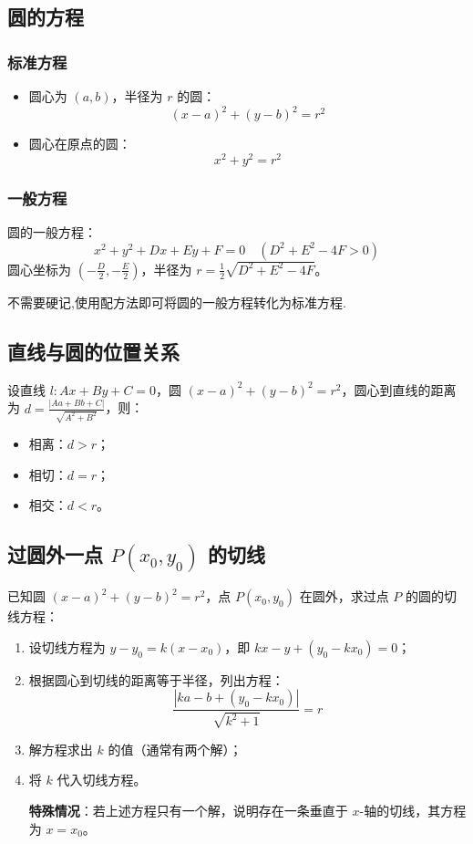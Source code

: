 \documentclass{article}
\begin{document}
\subsection{圆的方程}
\subsubsection{标准方程}
\begin{itemize}
    \item 圆心为 \( (a, b) \)，半径为 \( r \) 的圆：
          \[
          (x - a)^2 + (y - b)^2 = r^2
          \]
          
    \item 圆心在原点的圆：
          \[
          x^2 + y^2 = r^2
          \]
\end{itemize}

\subsubsection{一般方程}
圆的一般方程：
\[
x^2 + y^2 + Dx + Ey + F = 0 \quad (D^2 + E^2 - 4F > 0)
\]
圆心坐标为 \( \left( -\frac{D}{2}, -\frac{E}{2} \right) \)，半径为 \( r = \frac{1}{2}\sqrt{D^2 + E^2 - 4F} \)。

不需要硬记,使用配方法即可将圆的一般方程转化为标准方程.



\subsection{直线与圆的位置关系}
设直线 \( l: Ax + By + C = 0 \)，圆 \( (x - a)^2 + (y - b)^2 = r^2 \)，圆心到直线的距离为 \( d = \frac{|Aa + Bb + C|}{\sqrt{A^2 + B^2}} \)，则：
\begin{itemize}
    \item 相离：\( d > r \)；
    \item 相切：\( d = r \)；
    \item 相交：\( d < r \)。
\end{itemize}



\subsection{过圆外一点 \( P(x_0, y_0) \) 的切线}
已知圆 \( (x - a)^2 + (y - b)^2 = r^2 \)，点 \( P(x_0, y_0) \) 在圆外，求过点 \( P \) 的圆的切线方程：
\begin{enumerate}
    \item 设切线方程为 \( y - y_0 = k(x - x_0) \)，即 \( kx - y + (y_0 - kx_0) = 0 \)；
    \item 根据圆心到切线的距离等于半径，列出方程：
          \[
          \frac{|ka  - b + (y_0 - kx_0)|}{\sqrt{k^2 + 1}} = r
          \]
    \item 解方程求出 \( k \) 的值（通常有两个解）；
    \item 将 \( k \) 代入切线方程。
    
    \textbf{特殊情况}：若上述方程只有一个解，说明存在一条垂直于 \( x \)-轴的切线，其方程为 \( x = x_0 \)。
\end{enumerate}
\end{document}
